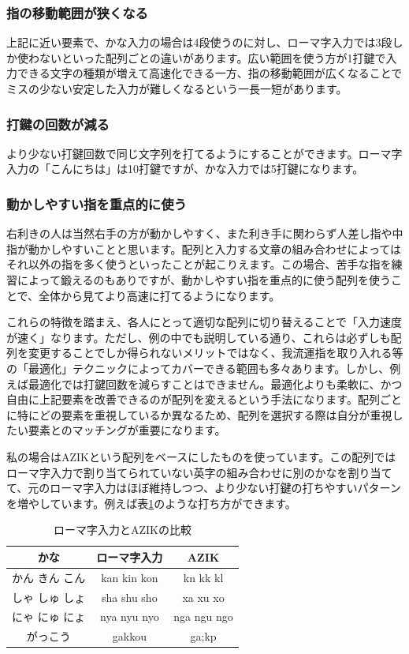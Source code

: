 \subsubsection*{指の移動範囲が狭くなる}
上記に近い要素で、かな入力の場合は4段使うのに対し、ローマ字入力では3段しか使わないといった配列ごとの違いがあります。広い範囲を使う方が1打鍵で入力できる文字の種類が増えて高速化できる一方、指の移動範囲が広くなることでミスの少ない安定した入力が難しくなるという一長一短があります。
\subsubsection*{打鍵の回数が減る}
より少ない打鍵回数で同じ文字列を打てるようにすることができます。ローマ字入力の「こんにちは」は10打鍵ですが、かな入力では5打鍵になります。
\subsubsection*{動かしやすい指を重点的に使う}
右利きの人は当然右手の方が動かしやすく、また利き手に関わらず人差し指や中指が動かしやすいことと思います。配列と入力する文章の組み合わせによってはそれ以外の指を多く使うといったことが起こりえます。この場合、苦手な指を練習によって鍛えるのもありですが、動かしやすい指を重点的に使う配列を使うことで、全体から見てより高速に打てるようになります。

これらの特徴を踏まえ、各人にとって適切な配列に切り替えることで「入力速度が速く」なります。ただし、例の中でも説明している通り、これらは必ずしも配列を変更することでしか得られないメリットではなく、我流運指を取り入れる等の「最適化」テクニックによってカバーできる範囲も多々あります。しかし、例えば最適化では打鍵回数を減らすことはできません。最適化よりも柔軟に、かつ自由に上記要素を改善できるのが配列を変えるという手法になります。配列ごとに特にどの要素を重視しているか異なるため、配列を選択する際は自分が重視したい要素とのマッチングが重要になります。

私の場合はAZIKという配列をベースにしたものを使っています。この配列ではローマ字入力で割り当てられていない英字の組み合わせに別のかなを割り当てて、元のローマ字入力はほぼ維持しつつ、より少ない打鍵の打ちやすいパターンを増やしています。例えば表\ref{tomoemon:compare_roman_azik}のような打ち方ができます。

\begin{table}
\begin{center}
\caption{ローマ字入力とAZIKの比較}
\label{tomoemon:compare_roman_azik}
\begin{tabular}{ccc}
\hline
かな & ローマ字入力 & AZIK \\
\hline
かん きん こん & kan kin kon & kn kk kl \\
しゃ しゅ しょ & sha shu sho & xa xu xo \\
にゃ にゅ にょ & nya nyu nyo & nga ngu ngo \\
がっこう & gakkou & ga;kp \\
\hline
\end{tabular}
\end{center}
\end{table}

